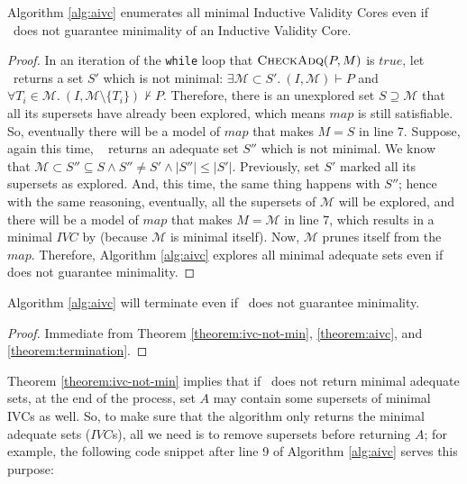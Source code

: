 \begin{theorem}
\label{theorem:ivc-not-min}
  Algorithm \ref{alg:aivc} enumerates all minimal Inductive Validity Cores
  even if \getivc ~does not guarantee minimality of an Inductive Validity Core.
\end{theorem}
\begin{proof}
In an iteration of the \texttt{while} loop that $\textsc{CheckAdq} (P, M)$ is $true$,
let \getivc ~returns a set $S'$ which is not minimal:
$\exists \mathcal{M} \subset S'.~ (I, \mathcal{M}) \vdash P$ and
$\forall T_i \in \mathcal{M} . ~ (I, \mathcal{M} \setminus \{T_i\}) \nvdash P$.
Therefore, there is an unexplored set $S \supseteq \mathcal{M}$ that all its supersets have already been explored, which means
$map$ is still satisfiable.
So, eventually there will be a model of $map$ that makes $M = S$ in line 7.
Suppose, again this time, \getivc ~ returns an adequate set $S''$ which is not minimal.
We know that
  $\mathcal{M} \subset S'' \subseteq S \wedge S'' \neq S' \wedge |S''| \leq |S'|$.
  Previously, set $S'$ marked all its supersets as explored. And, this time, the
  same thing happens with $S''$; hence with the same reasoning,
  eventually, all the supersets of $\mathcal{M}$ will be explored, and there will be a model of $map$ that makes $M = \mathcal{M}$ in line 7,
  which results in a minimal $IVC$ by \getivc (because $\mathcal{M}$ is minimal itself).
  Now,  $\mathcal{M}$  prunes itself from the $map$.
  Therefore, Algorithm \ref{alg:aivc} explores all minimal adequate sets even if \getivc ~
  does not guarantee minimality.
\end{proof}

\begin{theorem}
 Algorithm \ref{alg:aivc} will terminate even if \getivc ~does not guarantee minimality.
\end{theorem}
\begin{proof}
  Immediate from Theorem \ref{theorem:ivc-not-min}, \ref{theorem:aivc}, and \ref{theorem:termination}.
\end{proof}

Theorem \ref{theorem:ivc-not-min} implies that if \getivc ~does not 
return minimal adequate sets, at the end of the process,
 set $A$ may contain some supersets of
minimal IVCs as well. So, to make sure that the algorithm only returns 
the minimal adequate sets ($IVC$s), all we need is to 
remove supersets before returning $A$; for example, the following code snippet after line 9 of Algorithm \ref{alg:aivc} serves this purpose:

